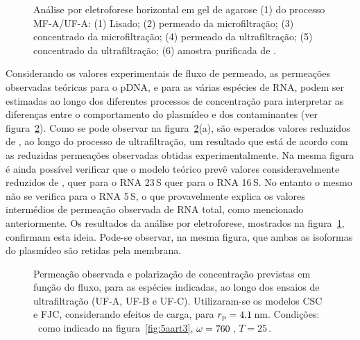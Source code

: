 \begin{figure}
\centering
{}
\caption[Eletroforese horizontal em gel de agarose do processo MF-A/UF-A]{Análise por eletroforese horizontal em gel de agarose (1\porcento) do processo MF-A/UF-A: (1) Lisado; (2) permeado da microfiltração; (3) concentrado da microfiltração; (4) permeado da ultrafiltração; (5) concentrado da ultrafiltração; (6) amostra purificada de \pVAX.}
\label{fig:5cart3}
\end{figure}

Considerando os valores experimentais de fluxo de permeado, as permeações observadas teóricas para o pDNA, e para as várias espécies de RNA, podem ser estimadas ao longo dos diferentes processos de concentração para interpretar as diferenças entre o comportamento do plasmídeo e dos contaminantes (ver figura~\ref{fig:6art3}). Como se pode observar na figura~\ref{fig:6art3}(a), são esperados valores reduzidos de \permobs, ao longo do processo de ultrafiltração, um resultado que está de acordo com as reduzidas permeações observadas obtidas experimentalmente.
%
Na mesma figura é ainda possível verificar que o modelo teórico prevê valores consideravelmente reduzidos de \permobs, quer para o RNA 23\,S quer para o RNA 16\,S. No entanto o mesmo não se verifica para o RNA 5\,S, o que provavelmente explica os valores intermédios de permeação observada de RNA total, como mencionado anteriormente.
%
%
%
Os resultados da análise por eletroforese, mostrados na figura~\ref{fig:5cart3}, confirmam esta ideia. Pode-se observar, na mesma figura, que ambas as isoformas do plasmídeo são retidas pela membrana.
%
%
\begin{figure}
\centering

\caption[Permeação e polarização de concentração previstas em função do fluxo]{Permeação observada e polarização de concentração previstas em função do fluxo, para as espécies indicadas, ao longo dos ensaios de ultrafiltração (UF-A, UF-B e UF-C). Utilizaram-se os modelos CSC e FJC, considerando efeitos de carga, para $r_{\mathrm{p}}=4.1$\,nm. Condições: \fluxo\ como indicado na figura~\ref{fig:5aart3}, $\omega=760$\,\minmum, $T=25$\,\degreecelsius.}
\label{fig:6art3}
\end{figure}


